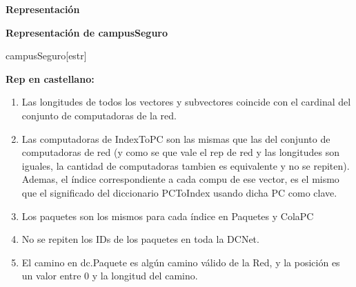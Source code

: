 \documentclass[a4paper,10pt]{article}
\newenvironment{Representacion}{%
  \vspace*{2ex}%
  \noindent\textbf{\Large Representación}%
  \vspace*{2ex}%
}{}
\begin{document}
\begin{Representacion}

\textbf{Representación de campusSeguro}

  \begin{Estructura}{campusSeguro}[estr]
    \begin{Tupla}[estr]
    \end{Tupla}
  \end{Estructura}	
 
 \textbf{Rep en castellano:}
  \begin{enumerate}
  \item Las longitudes de todos los vectores y subvectores coincide con el cardinal del conjunto de computadoras de la red.
  \item Las computadoras de IndexToPC son las mismas que las del conjunto de computadoras de red (y como se que vale el rep de red y las longitudes son iguales, la cantidad de computadoras tambien es equivalente y no se repiten). Ademas, el índice correspondiente a cada compu de ese vector, es el mismo que el significado del diccionario PCToIndex usando dicha PC como clave.
  \item Los paquetes son los mismos para cada índice en Paquetes y ColaPC
  \item No se repiten los IDs de los paquetes en toda la DCNet.
  \item El camino en dc.Paquete es algún camino válido de la Red, y la posición es un valor entre 0 y la longitud del camino.
  \end{enumerate}
  
  \newpage
\end{Representacion}
\end{document}

